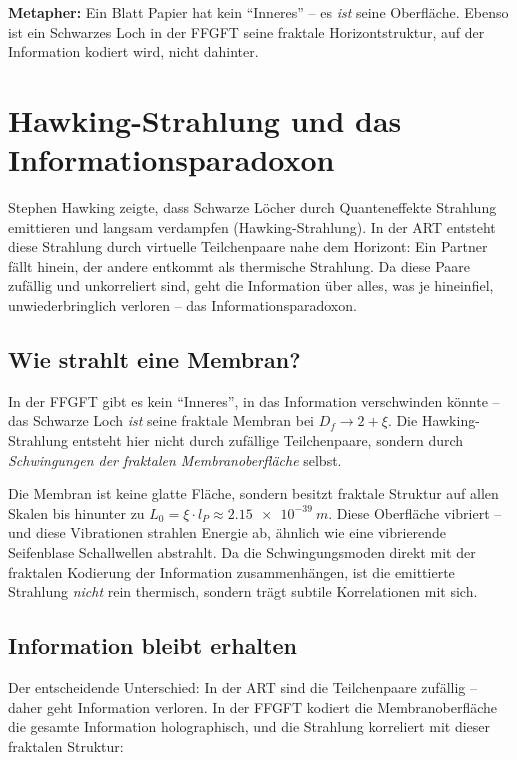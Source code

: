 	\textbf{Metapher:} Ein Blatt Papier hat kein \enquote{Inneres} -- es \textit{ist} seine Oberfläche. Ebenso ist ein Schwarzes Loch in der FFGFT seine fraktale Horizontstruktur, auf der Information kodiert wird, nicht dahinter.
	
	\section{Hawking-Strahlung und das Informationsparadoxon}
	
	Stephen Hawking zeigte, dass Schwarze Löcher durch Quanteneffekte Strahlung emittieren und langsam verdampfen (Hawking-Strahlung). In der ART entsteht diese Strahlung durch virtuelle Teilchenpaare nahe dem Horizont: Ein Partner fällt hinein, der andere entkommt als thermische Strahlung. Da diese Paare zufällig und unkorreliert sind, geht die Information über alles, was je hineinfiel, unwiederbringlich verloren -- das Informationsparadoxon.
	
	\subsection{Wie strahlt eine Membran?}
	
	In der FFGFT gibt es kein \enquote{Inneres}, in das Information verschwinden könnte -- das Schwarze Loch \textit{ist} seine fraktale Membran bei $D_f \to 2 + \xi$. Die Hawking-Strahlung entsteht hier nicht durch zufällige Teilchenpaare, sondern durch \textit{Schwingungen der fraktalen Membranoberfläche} selbst.
	
	Die Membran ist keine glatte Fläche, sondern besitzt fraktale Struktur auf allen Skalen bis hinunter zu $L_0 = \xi \cdot l_P \approx \SI{2.15e-39}{m}$. Diese Oberfläche vibriert -- und diese Vibrationen strahlen Energie ab, ähnlich wie eine vibrierende Seifenblase Schallwellen abstrahlt. Da die Schwingungsmoden direkt mit der fraktalen Kodierung der Information zusammenhängen, ist die emittierte Strahlung \textit{nicht} rein thermisch, sondern trägt subtile Korrelationen mit sich.
	
	\subsection{Information bleibt erhalten}
	
	Der entscheidende Unterschied: In der ART sind die Teilchenpaare zufällig -- daher geht Information verloren. In der FFGFT kodiert die Membranoberfläche die gesamte Information holographisch, und die Strahlung korreliert mit dieser fraktalen Struktur:
	
